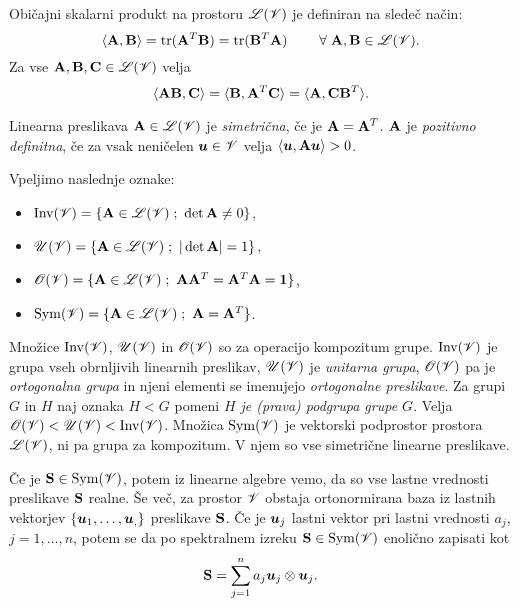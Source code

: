Običajni skalarni produkt na prostoru $\mathscr L(\mathscr V)$ je definiran na sledeč način:
\begin{equation*} %
	\langle\ten{A},\ten{B}\rangle=\tr(\ten{A}^T\ten{B})=\tr(\ten{B}^T\ten{A})
	\qquad\;\forall\;\ten{A},\ten{B}\in\L(\V).
\end{equation*}
Za vse $\mathbf A,\mathbf B,\mathbf C\in\mathscr L(\mathscr V)$ velja
\begin{equation} \label{e:skatra}
	\langle\mathbf A\mathbf B,\mathbf C\rangle=\langle\mathbf B,\mathbf A^{T}\mathbf C\rangle
	=\langle\mathbf A,\mathbf C\mathbf B^{T}\rangle.
\end{equation}

Linearna preslikava $\mathbf A\in\mathscr L(\mathscr V)$ je \emph{simetrična}, če je $\mathbf A=\mathbf A^T$.
$\mathbf A$ je \emph{pozitivno definitna}, če za vsak neničelen $\boldsymbol u\in\mathscr V$ velja
$\langle\boldsymbol u,\mathbf A\boldsymbol u\rangle >0$.

Vpeljimo naslednje oznake:
\begin{itemize}[noitemsep]
	\item $\mathrm{Inv}(\mathscr V)=\{\mathbf A\in\mathscr L(\mathscr V)\;;\ \det\mathbf A\neq 0 \}$,
	\item $\mathscr{U}(\mathscr V)=\{\mathbf A\in\mathscr L(\mathscr V)\;;\ |\det\mathbf A|=1 \}$,
	\item $\mathscr{O}(\mathscr V)=\{\mathbf A\in\mathscr L(\mathscr V)\;;\ \mathbf A\mathbf A^T=\mathbf A^T\mathbf A=\mathbf 1 \}$,
	\item $\mathrm{Sym}(\mathscr V)=\{\mathbf A\in\mathscr L(\mathscr V)\;;\ \mathbf A=\mathbf A^T \}$.
\end{itemize}
Množice $\mathrm{Inv}(\mathscr V)$, $\mathscr{U}(\mathscr V)$ in $\mathscr{O}(\mathscr V)$ so za operacijo kompozitum
grupe. $\mathrm{Inv}(\mathscr V)$ je grupa vseh obrnljivih linearnih preslikav, $\mathscr{U}(\mathscr V)$
je \emph{unitarna grupa}, $\mathscr{O}(\mathscr V)$ pa je \emph{ortogonalna grupa} in njeni elementi
se imenujejo \emph{ortogonalne preslikave}. Za grupi $G$ in $H$ naj oznaka $H<G$ pomeni \textit{$H$
je (prava) podgrupa grupe $G$}. Velja $\mathscr{O}(\mathscr V)<\mathscr{U}(\mathscr V)<\mathrm{Inv}(\mathscr V)$.
Množica $\mathrm{Sym}(\mathscr V)$ je vektorski podprostor prostora $\mathscr L(\mathscr V)$, ni pa grupa za kompozitum.
V njem so vse simetrične linearne preslikave.

Če je $\mathbf S\in\mathrm{Sym}(\mathscr V)$, potem iz linearne algebre vemo, da so vse lastne
vrednosti preslikave $\mathbf S$ realne. Še več, za prostor $\mathscr V$ obstaja ortonormirana baza
iz lastnih vektorjev $\{\boldsymbol u_1,\dots,\boldsymbol u_,\}$ preslikave $\mathbf S$. Če je
$\boldsymbol u_j$ lastni vektor pri lastni vrednosti $a_j$, $j=1,\dots,n$, potem se da po spektralnem
izreku $\mathbf S\in\mathrm{Sym}(\mathscr V)$ enolično zapisati kot
\begin{equation} \label{e:spekraz}
	\mathbf S=\sum_{j=1}^n a_j\boldsymbol u_j\otimes\boldsymbol u_j.
\end{equation}

